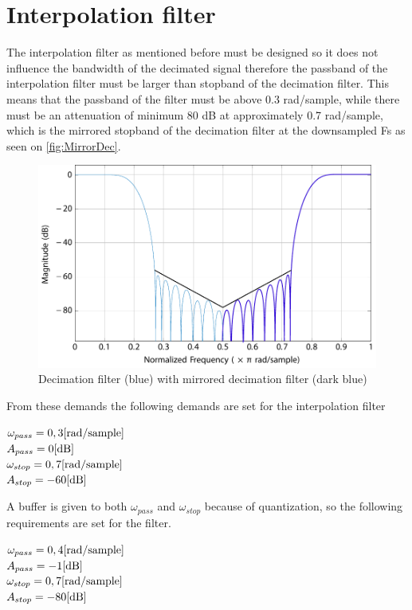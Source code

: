 \section{Interpolation filter} \label{sec:IntFilter}
The interpolation filter as mentioned before must be designed so it does not influence the bandwidth of the decimated signal therefore the passband of the interpolation filter must be larger than stopband of the decimation filter. This means that the passband of the filter must be above 0.3 rad/sample, while there must be an attenuation of minimum 80 dB at approximately 0.7 rad/sample, which is the mirrored stopband of the decimation filter at the downsampled Fs as seen on \autoref{fig:MirrorDec}. 

\begin{figure}[H]
\centering
	\includegraphics[width=\textwidth]{figures/DecIntCompMirror}
\caption{Decimation filter (blue) with mirrored decimation filter (dark blue)}
\label{fig:MirrorDec}
\end{figure}

From these demands the following demands are set for the interpolation filter

$\omega_{pass}=0,3 \enhed{rad/sample}$\\
$A_{pass}=0 \enhed{dB}$\\
$\omega_{stop}=0,7 \enhed{rad/sample}$\\
$A_{stop}=-60 \enhed{dB}$

A buffer is given to both $\omega_{pass}$ and $\omega_{stop}$ because of quantization, so the following requirements are set for the filter.

$\omega_{pass}=0,4 \enhed{rad/sample}$\\
$A_{pass}=-1 \enhed{dB}$\\
$\omega_{stop}=0,7 \enhed{rad/sample}$\\
$A_{stop}=-80 \enhed{dB}$

